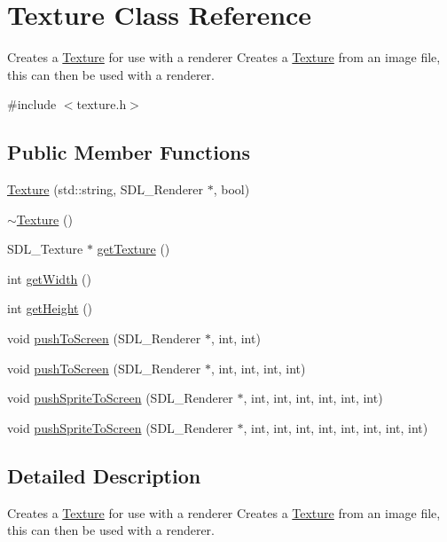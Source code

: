 \hypertarget{class_texture}{\section{Texture Class Reference}
\label{class_texture}
}


Creates a \hyperlink{class_texture}{Texture} for use with a renderer Creates a \hyperlink{class_texture}{Texture} from an image file, this can then be used with a renderer.  




{\ttfamily \#include $<$texture.\+h$>$}

\subsection*{Public Member Functions}
\begin{DoxyCompactItemize}
\item 
\hyperlink{class_texture_a6edf59e3b10e474356e8a7878af56b83}{Texture} (std\+::string, S\+D\+L\+\_\+\+Renderer $\ast$, bool)
\item 
\hyperlink{class_texture_a09c4bcb7462f64c1d20fa69dba3cee8a}{$\sim$\+Texture} ()
\item 
S\+D\+L\+\_\+\+Texture $\ast$ \hyperlink{class_texture_a77a1ae0043a4b318a60df3b02ef2d3f6}{get\+Texture} ()
\item 
int \hyperlink{class_texture_a91a6fd3355bc870194851514194daaab}{get\+Width} ()
\item 
int \hyperlink{class_texture_a80e143905655b173df5994300088ce35}{get\+Height} ()
\item 
void \hyperlink{class_texture_aec498f1f84eb10bb60d3c3117884e70f}{push\+To\+Screen} (S\+D\+L\+\_\+\+Renderer $\ast$, int, int)
\item 
void \hyperlink{class_texture_ab3b1f6aa29a50ef2c012fbc9d0cb8bd8}{push\+To\+Screen} (S\+D\+L\+\_\+\+Renderer $\ast$, int, int, int, int)
\item 
void \hyperlink{class_texture_a703db8963b46b751b8affce1807725b7}{push\+Sprite\+To\+Screen} (S\+D\+L\+\_\+\+Renderer $\ast$, int, int, int, int, int, int)
\item 
void \hyperlink{class_texture_a105a3aba66afb7d223ac086aa465b70d}{push\+Sprite\+To\+Screen} (S\+D\+L\+\_\+\+Renderer $\ast$, int, int, int, int, int, int, int, int)
\end{DoxyCompactItemize}


\subsection{Detailed Description}
Creates a \hyperlink{class_texture}{Texture} for use with a renderer Creates a \hyperlink{class_texture}{Texture} from an image file, this can then be used with a renderer. 

